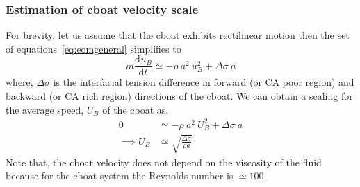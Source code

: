 \documentclass[journal=langd5, manuscript=article, layout=onecolumn]{achemso}
\newcommand{\tdc}[3][]{\frac{\mathrm{d}^{#1}#2}{\mathrm{d}#3^{#1}}} %
\begin{document}
\subsubsection{Estimation of cboat velocity scale}
For brevity, let us assume that the cboat exhibits rectilinear motion then the set of equations~\ref{eq:eomgeneral} simplifies to
\begin{equation}
m \tdc{u_{B}}{t} \simeq -\rho\ a^{2}\ u_{B}^{2} + \Delta\sigma\ a
\end{equation}
where, $\Delta\sigma$ is the interfacial tension difference in forward (or CA poor region) and backward (or CA rich region) directions of the cboat. We can obtain a scaling for the average speed, $U_{B}$ of the cboat as, 
\begin{align}
0 &\simeq -\rho\ a^{2}\ U_{B}^{2} + \Delta\sigma\ a  \nonumber \\
\implies U_{B} &\simeq \sqrt{\frac{\Delta\sigma}{\rho a}} 
\end{align}
Note that, the cboat velocity does not depend on the viscosity of the fluid because for the cboat system the Reynolds number is $\simeq 100$.
\end{document}
